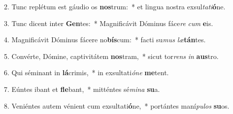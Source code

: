 2. Tunc replétum est gáudio os \textbf{nos}trum:~*  et lingua nostra exsul\textit{ta}\textit{ti}\textbf{ó}ne.\

3. Tunc dicent inter \textbf{Gen}tes:~*  Magnificávit Dóminus fáce\textit{re} \textit{cum} \textbf{e}is.\

4. Magnificávit Dóminus fácere no\textbf{bís}cum:~*  facti su\textit{mus} \textit{læ}\textbf{tán}tes.\

5. Convérte, Dómine, captivitátem \textbf{nos}tram,~*  sicut tor\textit{rens} \textit{in} \textbf{aus}tro.\

6. Qui séminant in \textbf{lá}crimis,~*  in exsultati\textit{ó}\textit{ne} \textbf{me}tent.\

7. Eúntes ibant et \textbf{fle}bant,~*  mitténtes sé\textit{mi}\textit{na} \textbf{su}a.\

8. Veniéntes autem vénient cum exsultati\textbf{ó}ne,~*  portántes maní\textit{pu}\textit{los} \textbf{su}os.\

